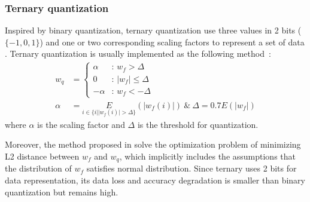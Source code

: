 \subsubsection{Ternary quantization}
Inspired by binary quantization, ternary quantization use three values in 2 bits ($\{-1,0,1\}$) and one or two corresponding scaling factors to represent a set of data \citep{TWNs,zhu2016trained, zhu2016trained,TWNs,alemdar2017ternary,jin2018sparse}. 
Ternary quantization is usually implemented as the following method~\citep{TWNs}:
\begin{align}
    w_q&=
    \begin{cases}
    \alpha&:\,w_f>\Delta\\
    0&:\,|w_f|\le \Delta\\
    -\alpha&:\, w_f<-\Delta
    \end{cases}\\
\alpha &=\underset{i\in\{i| |w_f(i)|>\Delta\}}{E}(|w_f(i)|)
    ~\&~ \Delta = 0.7E(|w_f|) \nonumber
\end{align}
where $\alpha$ is the scaling factor and $\Delta$ is the threshold for quantization. 

Moreover, the method proposed in \citep{TWNs} solve the optimization problem of minimizing L2 distance between $w_f$ and $w_q$, which implicitly includes the assumptions that the distribution of $w_f$ satisfies normal distribution.
Since ternary uses 2 bits for data representation, its data loss and accuracy degradation is smaller than binary quantization but remains high.

